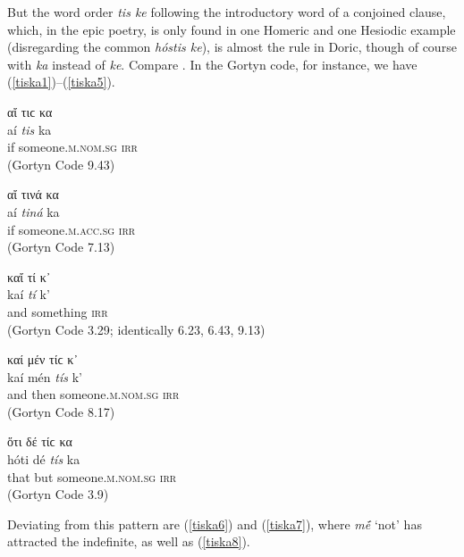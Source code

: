 But the word order \textit{tis ke} following the introductory word of a conjoined clause, which, in the epic poetry, is only found in one Homeric and one Hesiodic example (disregarding the common \textit{hóstis ke}), is almost the rule in Doric, though of course with \textit{ka} instead of \textit{ke}.\label{aitiska} Compare \citet[383]{Ahrens1843}. In the Gortyn code, for instance, we have (\ref{tiska1})--(\ref{tiska5}).

\begin{exe}
\ex αἴ τιϲ κα\\
\gll aí \emph{tis} ka\\
if someone.\textsc{m.nom.sg} \textsc{irr}\\
\trans (Gortyn Code 9.43)
\label{tiska1}
\end{exe}

\begin{exe}
\ex αἴ τινά κα\\
\gll aí \emph{tiná} ka\\
if someone.\textsc{m.acc.sg} \textsc{irr}\\
\trans (Gortyn Code 7.13)
\label{tiska2}
\end{exe}

\begin{exe}
\ex καἴ τί κ᾽\\
\gll kaí \emph{tí} k'\\
and something \textsc{irr}\\
\trans (Gortyn Code 3.29; identically 6.23, 6.43, 9.13)\\
\label{tiska3}
\end{exe}

\begin{exe}
\ex καί μέν τίϲ κ᾽\\
\gll kaí mén \emph{tís} k'\\
and then someone.\textsc{m.nom.sg} \textsc{irr}\\
\trans (Gortyn Code 8.17)
\label{tiska4}
\end{exe}

\begin{exe}
\ex ὅτι δέ τίϲ κα\\
\gll hóti dé \emph{tís} ka\\
that but someone.\textsc{m.nom.sg} \textsc{irr}\\
\trans (Gortyn Code 3.9)
\label{tiska5}
\end{exe}

Deviating from this pattern are (\ref{tiska6}) and (\ref{tiska7}), where \textit{mḗ} `not' has attracted the indefinite, as well as (\ref{tiska8}).

